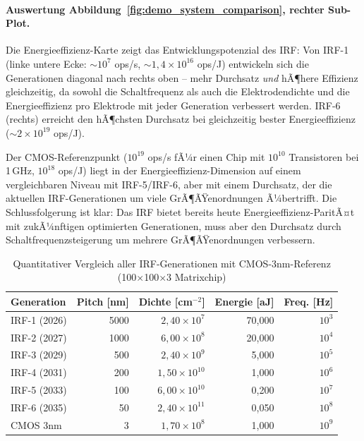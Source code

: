 ﻿\documentclass[a4paper,12pt]{scrreprt}
\theoremstyle{definition}
\begin{document}
\paragraph{Auswertung Abbildung~\ref{fig:demo_system_comparison}, rechter Sub-Plot.}
Die Energieeffizienz-Karte zeigt das Entwicklungspotenzial des IRF: Von
IRF-1 (linke untere Ecke: $\sim 10^7$ ops/s, $\sim 1{,}4 \times 10^{16}$ ops/J)
entwickeln sich die Generationen diagonal nach rechts oben -- mehr Durchsatz
\emph{und} hÃ¶here Effizienz gleichzeitig, da sowohl die Schaltfrequenz als auch
die Elektrodendichte und die Energieeffizienz pro Elektrode mit jeder Generation
verbessert werden. IRF-6 (rechts) erreicht den hÃ¶chsten Durchsatz bei
gleichzeitig bester Energieeffizienz ($\sim 2 \times 10^{19}$ ops/J).

Der CMOS-Referenzpunkt ($10^{19}$ ops/s fÃ¼r einen Chip mit $10^{10}$ Transistoren
bei 1\,GHz, $10^{18}$ ops/J) liegt in der Energieeffizienz-Dimension auf
einem vergleichbaren Niveau mit IRF-5/IRF-6, aber mit einem Durchsatz,
der die aktuellen IRF-Generationen um viele GrÃ¶ÃŸenordnungen Ã¼bertrifft.
Die Schlussfolgerung ist klar: Das IRF bietet bereits heute Energieeffizienz-ParitÃ¤t
mit zukÃ¼nftigen optimierten Generationen, muss aber den Durchsatz durch
Schaltfrequenzsteigerung um mehrere GrÃ¶ÃŸenordnungen verbessern.

\begin{table}[H]
	\centering
	\caption{Quantitativer Vergleich aller IRF-Generationen mit CMOS-3nm-Referenz
		(100$\times$100$\times$3 Matrixchip)}
	\label{tab:roadmap_vergleich}
	\begin{tabular}{lrrrr}
		\toprule
		\textbf{Generation} & \textbf{Pitch [nm]} & \textbf{Dichte [cm$^{-2}$]} & \textbf{Energie [aJ]} & \textbf{Freq. [Hz]} \\
		\midrule
		IRF-1 (2026) & 5000 & $2{,}40 \times 10^{7}$  & 70,000 & $10^3$ \\
		IRF-2 (2027) & 1000 & $6{,}00 \times 10^{8}$  & 20,000 & $10^4$ \\
		IRF-3 (2029) &  500 & $2{,}40 \times 10^{9}$  &  5,000 & $10^5$ \\
		IRF-4 (2031) &  200 & $1{,}50 \times 10^{10}$ &  1,000 & $10^6$ \\
		IRF-5 (2033) &  100 & $6{,}00 \times 10^{10}$ &  0,200 & $10^7$ \\
		IRF-6 (2035) &   50 & $2{,}40 \times 10^{11}$ &  0,050 & $10^8$ \\
		\midrule
		CMOS 3nm     &    3 & $1{,}70 \times 10^{8}$  &  1,000 & $10^9$ \\
		\bottomrule
	\end{tabular}
\end{table}
\end{document}
